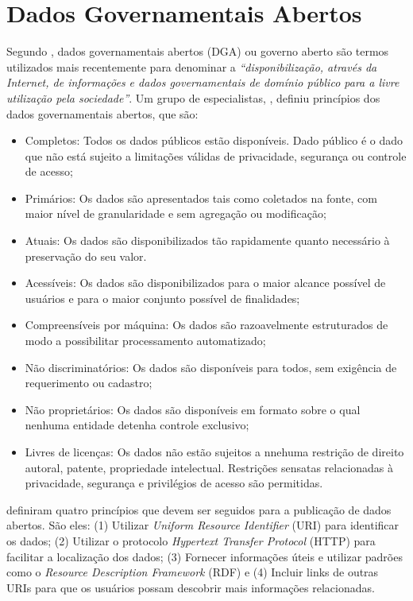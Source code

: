 \documentclass[
	12pt,				%
	openright,			%
	twoside,			%
	a4paper,			%
	english,			%
	french,				%
	spanish,			%
	brazil				%
	]{abntex2}
\begin{document}
\chapter[Dados Governamentais Abertos]{Dados Governamentais Abertos} 
Segundo , dados governamentais abertos (DGA) ou governo aberto são termos utilizados mais recentemente para denominar a \emph{“disponibilização,
através da Internet, de informações e dados governamentais de domínio público para a livre utilização pela sociedade”}. Um grupo de especialistas, , definiu princípios dos dados governamentais abertos, que são:
\begin{itemize}
  \item Completos: Todos os dados públicos estão disponíveis. Dado público é o dado que não está sujeito a limitações válidas de privacidade, segurança ou controle de acesso;
  \item Primários: Os dados são apresentados tais como coletados na fonte, com maior nível de granularidade e sem agregação ou modificação;
  \item Atuais: Os dados são disponibilizados tão rapidamente quanto necessário à preservação do seu valor.
  \item Acessíveis: Os dados são disponibilizados para o maior alcance possível de usuários e para o maior conjunto possível de finalidades;
  \item Compreensíveis por máquina: Os dados são razoavelmente estruturados de modo a possibilitar processamento automatizado;
  \item Não discriminatórios: Os dados são disponíveis para todos, sem exigência de requerimento ou cadastro;
  \item Não proprietários: Os dados são disponíveis em formato sobre o qual nenhuma entidade detenha controle exclusivo;
  \item Livres de licenças: Os dados não estão sujeitos a nnehuma restrição de direito autoral, patente, propriedade intelectual. Restrições sensatas relacionadas à privacidade, segurança e privilégios de acesso são permitidas.
\end{itemize}

 definiram quatro princípios que devem ser seguidos para a publicação de dados abertos. São eles: (1) 
Utilizar \emph{Uniform Resource Identifier} (URI) para identificar os dados; (2) Utilizar o protocolo \emph{Hypertext Transfer Protocol} 
(HTTP) para facilitar a localização dos dados; (3) Fornecer informações úteis e utilizar padrões como o \emph{Resource Description 
Framework} (RDF) e (4) Incluir links de outras URIs para que os usuários possam descobrir mais informações relacionadas.
\end{document}
